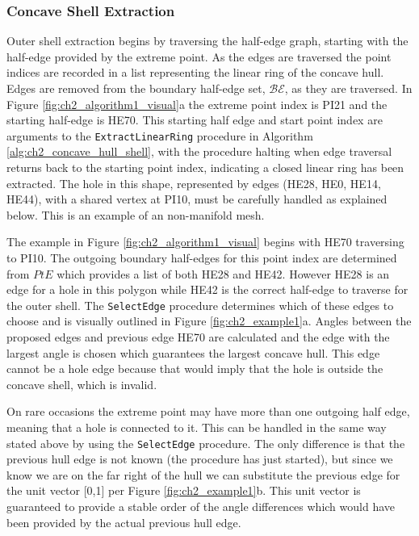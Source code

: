 \subsubsection{Concave Shell Extraction}
Outer shell extraction begins by traversing the half-edge graph, starting with the half-edge provided by the extreme point. As the edges are traversed the point indices are recorded in a list representing the linear ring of the concave hull. Edges are removed from the boundary half-edge set, $\mathcal{BE}$, as they are traversed.  In Figure \ref{fig:ch2_algorithm1_visual}a the extreme point index is PI21 and the starting half-edge is HE70. This starting half edge and start point index are arguments to the \texttt{ExtractLinearRing} procedure in Algorithm \ref{alg:ch2_concave_hull_shell}, with the procedure halting when edge traversal returns back to the starting point index, indicating a closed linear ring has been extracted. The hole in this shape, represented by edges (HE28, HE0, HE14, HE44), with a shared vertex at PI10, must be carefully handled as explained below. This is an example of an non-manifold mesh.

The example in Figure \ref{fig:ch2_algorithm1_visual} begins with HE70 traversing to PI10. The outgoing boundary half-edges for this point index are determined from $PtE$ which provides a list of both HE28 and HE42. However HE28 is an edge for a hole in this polygon while HE42 is the correct half-edge to traverse for the outer shell. The \texttt{SelectEdge} procedure determines which of these edges to choose and is visually outlined in Figure \ref{fig:ch2_example1}a. Angles between the proposed edges and previous edge HE70 are calculated and the edge with the largest angle is chosen which guarantees the largest concave hull.  This edge cannot be a hole edge because that would imply that the hole is outside the concave shell, which is invalid.

On rare occasions the extreme point may have more than one outgoing half edge, meaning that a hole is connected to it.  This can be handled in the same way stated above by using the \texttt{SelectEdge} procedure. The only difference is that the previous hull edge is not known (the procedure has just started), but since we know we are on the far right of the hull we can substitute the previous edge for the unit vector [0,1] per Figure \ref{fig:ch2_example1}b. This unit vector is guaranteed to provide a stable order of the angle differences which would have been provided by the actual previous hull edge.

